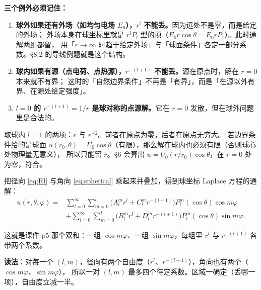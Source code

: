 \textbf{三个例外必须记住：}

\begin{enumerate}[label=\textbf{(\arabic*)}]
  \item \textbf{球外如果还有外场（如均匀电场 $E_0$），$r^l$ 不能丢。}因为远处不是零，而是给定的外场；
        外场本身在球坐标里就是 $r^lP_l$ 型的项（$E_0r\cos\theta=E_0rP_1$）。此时通解两组都留，
        用「$r\to\infty$ 时趋于给定外场」与「球面条件」各定一部分系数。§8.2 的导线例题就是这个结构。
  \item \textbf{球内如果有源（点电荷、点热源），$r^{-(l+1)}$ 不能丢。}源在原点时，解在 $r=0$ 本来就不有界；
        这时的「自然边界条件」不再是「有界」，而是「在源以外有界、在源处给定强度」。
  \item \textbf{$l=0$ 的 $r^{-(l+1)}=1/r$ 是球对称的点源解。}它在 $r=0$ 发散，但在球外问题里是合法的。
\end{enumerate}


取球内 $l=1$ 的两项：$r$ 与 $r^{-2}$。前者在原点为零，后者在原点无穷大。
若边界条件给的是球面 $u(r_0,\theta)=U_0\cos\theta$（有限），那么解在球内也必须有限（否则球心处物理量无意义），
所以只能留 $r$。\S6 会算出 $u=U_0(r/r_0)\cos\theta$，在 $r=0$ 处为零，符合。

\label{sec:s6}


把径向 \eqref{eq:Rl} 与角向 \eqref{eq:spherical} 乘起来并叠加，得到球坐标 Laplace 方程的通解：
\begin{equation}
\begin{aligned}
u(r,\theta,\varphi)={}&\sum_{l=0}^{\infty}\sum_{m=0}^{l}
\big(A_l^m r^l+C_l^m r^{-(l+1)}\big)P_l^m(\cos\theta)\cos m\varphi\\
&+\sum_{l=0}^{\infty}\sum_{m=0}^{l}
\big(B_l^m r^l+D_l^m r^{-(l+1)}\big)P_l^m(\cos\theta)\sin m\varphi .
\end{aligned}
\label{eq:general}
\end{equation}

这就是课件 p5 那个双和：一组 $\cos m\varphi$、一组 $\sin m\varphi$，每组里 $r^l$ 与 $r^{-(l+1)}$ 各带两个系数。

\textbf{读法}：对每一个 $(l,m)$，径向有两个自由度（$r^l$、$r^{-(l+1)}$），角向也有两个（$\cos m\varphi$、$\sin m\varphi$），
所以一对 $(l,m)$ 最多四个待定系数。区域一确定（丢哪一项），自由度立减一半。

